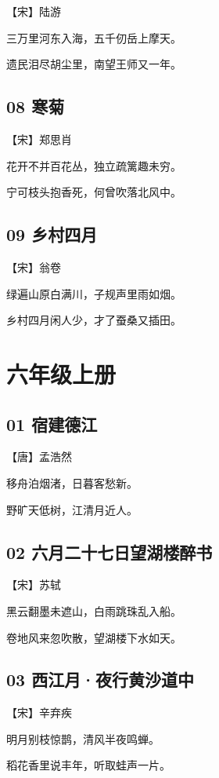 \documentclass[12pt]{article}
\begin{document}
【宋】陆游

三万里河东入海，五千仞岳上摩天。

遗民泪尽胡尘里，南望王师又一年。

\subsection*{08 寒菊}

【宋】郑思肖

花开不并百花丛，独立疏篱趣未穷。

宁可枝头抱香死，何曾吹落北风中。

\subsection*{09 乡村四月}

【宋】翁卷

绿遍山原白满川，子规声里雨如烟。

乡村四月闲人少，才了蚕桑又插田。

\newpage

\section*{六年级上册}

\subsection*{01 宿建德江}

【唐】孟浩然

移舟泊烟渚，日暮客愁新。

野旷天低树，江清月近人。

\subsection*{02 六月二十七日望湖楼醉书}

【宋】苏轼

黑云翻墨未遮山，白雨跳珠乱入船。

卷地风来忽吹散，望湖楼下水如天。

\subsection*{03 西江月·夜行黄沙道中}

【宋】辛弃疾

明月别枝惊鹊，清风半夜鸣蝉。

稻花香里说丰年，听取蛙声一片。
\end{document}
